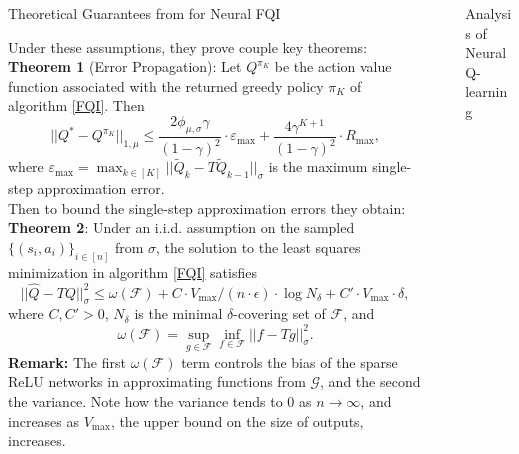 \documentclass[final]{beamer}
\newlength{\sepwidth}
\newlength{\colwidth}
\newcommand{\separatorcolumn}{\begin{column}{\sepwidth}\end{column}}
\begin{document}
\begin{frame}[t]
\begin{columns}[t]
\begin{column}{\colwidth}
\begin{block}{Theoretical Guarantees from \cite{theor} for Neural FQI}
\begin{enumerate}[(a)]
\begin{itemize}
 \end{itemize}
\end{enumerate}
Under these assumptions, they prove couple key theorems: \\
\textbf{Theorem 1} (Error Propagation): Let $Q^{\pi_K}$ be the action value function associated with the returned greedy policy $\pi_K$ of algorithm \ref{FQI}.  Then $$||Q^* - Q^{\pi_K}||_{1,\mu} \le \frac{2 \phi_{\mu, \sigma} \gamma}{(1-\gamma)^2}  \cdot \varepsilon_{\text{max}} + \frac{4 \gamma^{K+1}}{(1-\gamma)^2} \cdot R_{\text{max}},$$ where $\varepsilon_{\text{max}} = \max_{k \in [K]}||\widetilde{Q}_k - T \widetilde{Q}_{k-1}||_\sigma$ is the maximum single-step approximation error. \\
Then to bound the single-step approximation errors they obtain: \\
\textbf{Theorem 2}: Under an i.i.d. assumption on the sampled $\{(s_i, a_i)\}_{i \in [n]}$ from $\sigma$, the solution to the least squares minimization in algorithm \ref{FQI} satisfies $$||\widehat{Q} - TQ||_{\sigma}^2 \le \omega(\mathcal{F}) + C \cdot V_{\text{max}}/(n \cdot \epsilon) \cdot \log N_{\delta} + C' \cdot V_{\text{max}} \cdot \delta,$$ where $C, C' > 0$, $N_{\delta}$ is the minimal $\delta$-covering set of $\mathcal{F}$, and $$\omega(\mathcal{F}) = \sup_{g \in \mathcal{F}} \inf_{f \in \mathcal{F}} ||f - Tg||_\sigma^2.$$
\textbf{Remark:} The first $\omega(\mathcal{F})$ term controls the bias of the sparse ReLU networks in approximating functions from $\mathcal{G}$, and the second the variance.  Note how the variance tends to $0$ as $n \to \infty$, and increases as $V_{\text{max}}$, the upper bound on the size of outputs, increases.

  \end{block}
\begin{block}

    \nocite{*}
    \footnotesize{}

\end{block}
\end{column}

\separatorcolumn

\begin{column}{\colwidth}

\begin{block}{Analysis of Neural Q-learning}


\end{block}
\end{column}
\end{columns}
\end{frame}
\end{document}
